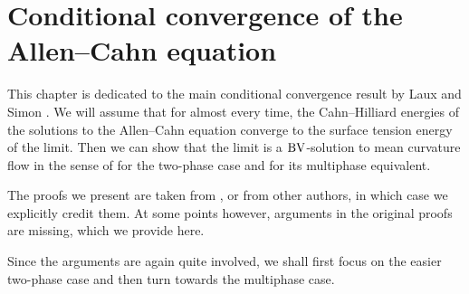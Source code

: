 \chapter{Conditional convergence of the Allen--Cahn equation}
\label{chapter_conditional_convergence_of_ac}

This chapter is dedicated to the main conditional convergence result by Laux 
and Simon 
\cite{convergence_of_allen_cahn_equation_to_multiphase_mean_curvature_flow}.
We will assume that for almost every time, the 
Cahn--Hilliard energies of the solutions to the Allen--Cahn equation converge 
to the surface tension energy of the limit. Then we can show that the limit is 
a $ \operatorname{BV} 
$-solution to mean curvature flow in the sense of  for the 
two-phase case and  for its multiphase equivalent.

The proofs we present are taken from 
\cite{convergence_of_allen_cahn_equation_to_multiphase_mean_curvature_flow}, 
or from other authors, 
in which case we explicitly credit them. At some points however, arguments 
in the original proofs are missing, which we provide here.

Since the arguments are again quite involved, we shall first focus on the 
easier 
two-phase case and then turn towards the multiphase case.


